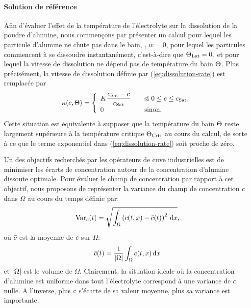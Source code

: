 \paragraph{Solution de référence} Afin d'évaluer l'effet de la
température de l'électrolyte sur la dissolution de la poudre
d'alumine, nous commençons par présenter un calcul pour lequel les
particule d'alumine ne chute pas dans le bain, \ie, $w = 0$, pour
lequel les particules commencent à se dissoudre instantanément,
c'est-à-dire que $\Theta_\text{Lat} = 0$, et pour lequel la
vitesse de dissolution ne dépend pas de température du bain
$\Theta$. Plus précisément, la vitesse de dissolution définie
par (\ref{eq:dissolution-rate}) est remplacée par
\begin{equation}
  \kappa(c, \Theta)= \left\{
  \begin{array}{ll}
    K\displaystyle\frac{c_\text{Sat} - c}{c_\text{Sat}} &\quad \text{si } 0\leq
    c \leq c_\text{Sat},\\
    0& \quad \text{sinon}.
  \end{array}
  \right.
\end{equation}
Cette situation est équivalente à supposer que la température du
bain $\Theta$ reste largement supérieure à la température
critique $\Theta_\text{Crit}$ au cours du calcul, de sorte à ce que le terme
exponentiel dans (\ref{eq:dissolution-rate}) soit proche de zéro.

Un des objectifs recherchés par les opérateurs de cuve
industrielles est de minimiser les écarts de concentration autour de
la concentration d'alumine dissoute optimale. Pour évaluer le champ
de concentration par rapport à cet objectif, nous proposons de
représenter la variance  du champ de concentration
$c$ dans $\Omega$ au cours du temps définie par:
\begin{equation}
  \operatorname{Var}_c(t) = \sqrt{\int_\Omega\left( c(t, x) - \bar {c}(t) \right)^2\,\mathrm dx},
\end{equation}
où $\bar {c}$ est la moyenne de $c$ sur
$\Omega$:
\begin{equation}
  \bar {c}(t) = \frac{1}{\left\lvert \Omega \right\rvert}\int_\Omega c(t, x)\,\mathrm dx
\end{equation}
et $\left\lvert \Omega \right\rvert$ est le volume de $\Omega$. Clairement, la situation
idéale où la concentration d'alumine est uniforme dans tout
l'électrolyte correspond à une variance de $c$ nulle. A
l'inverse, plus $c$ s'écarte de sa valeur moyenne, plus
sa variance est importante.

